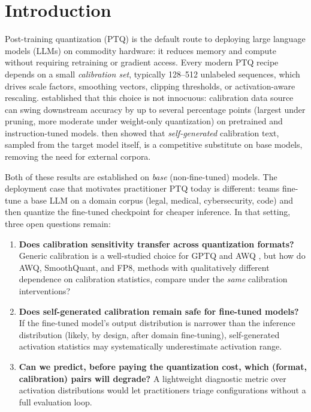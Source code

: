 \documentclass[11pt]{article}
\begin{document}
\section{Introduction}
\label{sec:intro}

\begin{sloppypar}
Post-training quantization (PTQ) is the default route to deploying
large language models (LLMs) on commodity hardware: it reduces
memory and compute without requiring retraining or gradient
access.  Every modern PTQ recipe depends on a small
\emph{calibration set}, typically 128--512 unlabeled sequences,
which drives scale factors, smoothing vectors, clipping
thresholds, or activation-aware rescaling.
\citet{williams2024calibration} established that this choice is
not innocuous: calibration data source can swing downstream
accuracy by up to several percentage points (largest under
pruning, more moderate under weight-only quantization) on
pretrained and instruction-tuned models.
\citet{williams2025selfcalib} then showed that
\emph{self-generated} calibration text, sampled from the target
model itself, is a competitive substitute on base models,
removing the need for external corpora.
\end{sloppypar}

Both of these results are established on \emph{base} (non-fine-tuned)
models.  The deployment case that motivates practitioner PTQ today is
different: teams fine-tune a base LLM on a domain corpus (legal, medical,
cybersecurity, code) and then quantize the fine-tuned checkpoint for
cheaper inference.  In that setting, three open questions remain:

\begin{enumerate}
  \item \textbf{Does calibration sensitivity transfer across quantization
    formats?}  Generic calibration is a well-studied choice for GPTQ
    \citep{frantar2022gptq} and AWQ \citep{lin2023awq}, but how do AWQ,
    SmoothQuant, and FP8, methods with qualitatively different dependence
    on calibration statistics, compare under the \emph{same} calibration
    interventions?
  \item \textbf{Does self-generated calibration remain safe for
    fine-tuned models?}  If the fine-tuned model's output distribution
    is narrower than the inference distribution (likely, by design, after
    domain fine-tuning), self-generated activation statistics may
    systematically underestimate activation range.
  \item \textbf{Can we predict, before paying the quantization cost, which
    (format, calibration) pairs will degrade?}  A lightweight diagnostic
    metric over activation distributions would let practitioners triage
    configurations without a full evaluation loop.
\end{enumerate}
\end{document}
